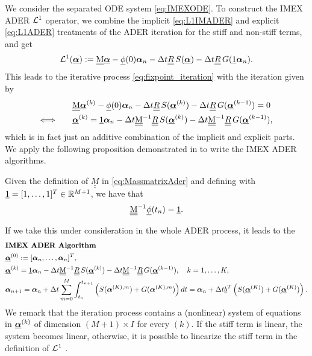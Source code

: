 We consider the separated ODE system \eqref{eq:IMEXODE}. To construct the IMEX ADER $\mathcal L^1$ operator, we combine the implicit \eqref{eq:L1IMADER} and explicit \eqref{eq:L1ADER} treatments of the ADER iteration for the stiff and non-stiff terms, and get
\begin{equation}
\label{eq:IMEXADERL1}
\mathcal{L}^1(\vec{\bc}) :=  \M \vec{\bc} - \vec{\phi}(0)\bc_n -\Delta t \mat{R} S(\vec{\bc})-\Delta t \mat{R} G(\vec{1} \bc_n).
\end{equation}
This leads to the iterative process \eqref{eq:fixpoint_iteration} with the iteration given by
\begin{equation}
\begin{aligned}
&\M \vec{\bc}^{(k)} - \vec{\phi}(0)\bc_n -\Delta t \mat{R} S(\vec{\bc}^{(k)}) - \Delta t \mat{R} G(\vec{\bc}^{(k-1)})=0\\
\Longleftrightarrow\qquad &\vec{\bc}^{(k)} = \vec{1}\bc_n -\Delta t \M^{-1}\mat{R} S(\vec{\bc}^{(k)}) - \Delta t \M^{-1}\mat{R} G(\vec{\bc}^{(k-1)}),
\end{aligned}
\end{equation}
which is in fact just an additive combination of the implicit and explicit parts.
We apply the following proposition demonstrated in \cite[Proposition 2.4]{veiga2023improving} to write the IMEX ADER algorithms.
\begin{prop}\label{prop:RHS_ADER}
	Given the definition of $\underline{\underline{M}}$ in \eqref{eq:MassmatrixAder} and defining with $\underline{1}=[1,\dots,1]^T \in \mathbb R^{M+1}$, we have that 
	\begin{equation}
		\underline{\underline{\mathrm{M}}}^{-1}\underline{\phi}(t_n) = \underline{1}.
	\end{equation}
\end{prop}

If we take this under consideration in the whole ADER process, it leads to the %
\begin{equation}
\begin{aligned}
&\text{\textbf{IMEX ADER Algorithm}}\\
&\bbc^{(0)}:=[\bc_n,\dots, \bc_n ]^T,\\
&\bbc^{(k)}=\vec{1}\bc_n -\Delta t \M^{-1}\mat{R} S(\vec{\bc}^{(k)}) - \Delta t \M^{-1}\mat{R} G(\vec{\bc}^{(k-1)}), \quad k=1,\dots,K,\\
&\bc_{n+1}=\bc_n+\Delta t \sum_{m=0}^M\int_{t_n}^{t_{n+1}} \left(S(\bc^{(K),m})+G(\bc^{(K),m})\right)dt=\bc_n+\Delta t \underline{b}^T\left(S(\bbc^{(K)})+G(\bbc^{(K)})\right). %
\end{aligned}
\end{equation}
We remark that the iteration process contains a (nonlinear) system of equations in $\underline{\boldsymbol{\alpha}}^{(k)}$ of dimension $(M+1)\times I$ for every $(k)$. If the stiff term is linear, the system becomes linear, otherwise, it is possible to linearize the stiff term in the definition of $\mathcal L^1$ \cite{Han_Veiga_2021}.
 
